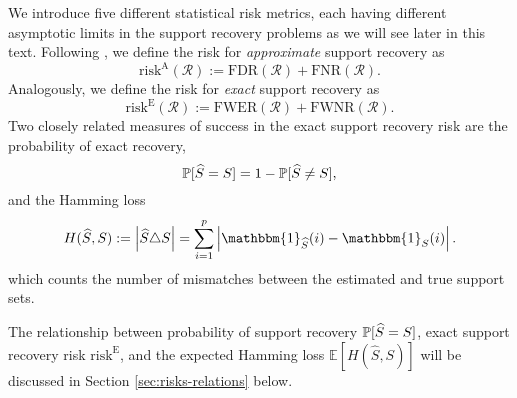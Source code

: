 We introduce five different statistical risk metrics, 
each having different asymptotic limits in the support recovery problems as we will see later in this text. 
Following \cite{arias2017distribution}, we define the risk for \emph{approximate} support recovery as
\begin{equation} \label{eq:risk-approximate}
    \mathrm{risk}^{\mathrm{A}}(\mathcal{R}) := \mathrm{FDR}(\mathcal{R}) + \mathrm{FNR}(\mathcal{R}).
\end{equation}
Analogously, we define the risk for \emph{exact} support recovery as
\begin{equation} \label{eq:risk-exact}
    \mathrm{risk}^{\mathrm{E}}(\mathcal{R}) := \mathrm{FWER}(\mathcal{R}) + \mathrm{FWNR}(\mathcal{R}).
\end{equation}
Two closely related measures of success in the exact support recovery risk are the probability of exact recovery, 
\begin{equation} \label{eq:risk-prob}
    \P[\widehat{S} = S] = 1 - \P[\widehat{S} \neq S],
\end{equation}
and the Hamming loss
\begin{equation} \label{eq:Hamming-loss}
    H(\widehat S, S) := \left|\widehat{S}\triangle S\right|
    = \sum\limits_{i=1}^p\left|\mathbbm{1}_{\widehat{S}}(i)- \mathbbm{1}_{S}(i)\right|.
\end{equation}
which counts the number of mismatches between the estimated and true support sets.

The relationship between probability of support recovery $\P[\widehat{S} = S]$, exact support recovery risk $\mathrm{risk}^{\mathrm{E}}$, and the expected Hamming loss $\mathbb{E}[H(\widehat S, S)]$ will be discussed in Section \ref{sec:risks-relations} below.

\medskip


